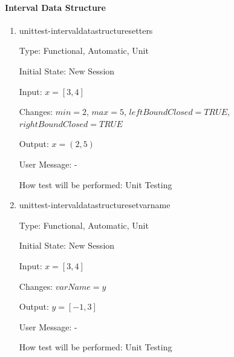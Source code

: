 \documentclass[12pt, titlepage]{article}
\begin{document}
\paragraph{Interval Data Structure}
\begin{enumerate}
	
	\item{unittest-intervaldatastructuresetters}
	
	Type: Functional, Automatic, Unit
	
	Initial State: New Session
	
	Input: $x = [3,4]$
	
	Changes: $min = 2$, $max = 5$, $leftBoundClosed = TRUE$, $rightBoundClosed 
	= TRUE$
	
	Output: $x = (2,5)$
	
	User Message: - 
	
	How test will be performed: Unit Testing\\
	
	\item{unittest-intervaldatastructuresetvarname}
	
	Type: Functional, Automatic, Unit
	
	Initial State: New Session
	
	Input: $x = [3,4]$
	
	Changes: $varName = y$
	
	Output: $y = [-1,3]$
	
	User Message: -
	
	How test will be performed: Unit Testing\\
	
\end{enumerate}
\end{document}
